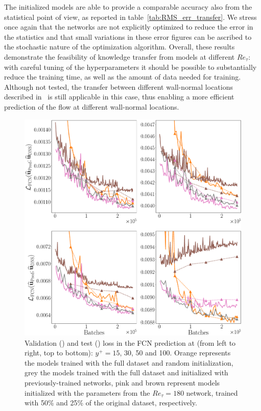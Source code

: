 The initialized models are able to provide a comparable accuracy also from the statistical point of view, as reported in table~\ref{tab:RMS_err_transfer}.
We stress once again that the networks are not explicitly optimized to reduce the error in the statistics and that small variations in these error figures can be ascribed to the stochastic nature of the optimization algorithm.
Overall, these results demonstrate the feasibility of knowledge transfer from models at different $Re_{\tau}$: with careful tuning of the hyperparameters it should be possible to substantially reduce the training time, as well as the amount of data needed for training.
Although not tested, the transfer between different wall-normal locations described in~\citet{guastoni2020prediction} is still applicable in this case, thus enabling a more efficient prediction of the flow at different wall-normal locations.
\begin{figure}
    \centerline{\includegraphics[width=\textwidth]{transfer_learning_v4.eps}}
    \caption{Validation (\full) and test (\dashed) loss in the FCN prediction at (from left to right, top to bottom): $y^+=15$, 30, 50 and 100. Orange represents the models trained with the full dataset and random initialization, grey the models trained with the full dataset and initialized with previously-trained networks, pink and brown represent models initialized with the parameters from the $Re_{\tau}=180$ network, trained with 50\% and 25\% of the original dataset, respectively.}
    \label{fig:transfer}
\end{figure}

